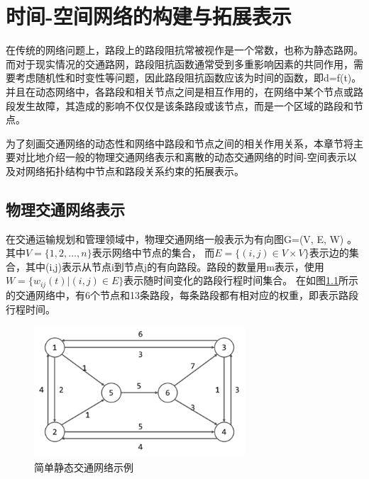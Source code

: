 \chapter{时间-空间网络的构建与拓展表示}\label{ch:时间-空间网络的构建与拓展表示}

在传统的网络问题上，路段上的路段阻抗常被视作是一个常数，也称为静态路网。而对于现实情况的交通路网，路段阻抗函数通常受到多重影响因素的共同作用，需要考虑随机性和时变性等问题，因此路段阻抗函数应该为时间的函数，即d=f(t)。并且在动态网络中，各路段和相关节点之间是相互作用的，在网络中某个节点或路段发生故障，其造成的影响不仅仅是该条路段或该节点，而是一个区域的路段和节点。

为了刻画交通网络的动态性和网络中路段和节点之间的相关作用关系，本章节将主要对比地介绍一般的物理交通网络表示和离散的动态交通网络的时间-空间表示以及对网络拓扑结构中节点和路段关系约束的拓展表示。


\section{物理交通网络表示}\label{sec:物理交通网络表示}

在交通运输规划和管理领域中，物理交通网络一般表示为有向图G=(V, E, W) 。其中$V=\{1, 2, \dots,n\}$表示网络中节点的集合，
而$E=\{(i,j) \in V \times V\}$表示边的集合，其中(i,j)表示从节点i到节点j的有向路段。路段的数量用m表示，使用$W=\{w_{ij} (t)|(i,j)\in E\}$表示随时间变化的路段行程时间集合。
在如图\ref{fig:fig2}所示的交通网络中，有6个节点和13条路段，每条路段都有相对应的权重，即表示路段行程时间。
\begin{figure}[H] %
    \centering %
    \includegraphics[width=0.7\textwidth]{png/图片2 简单静态交通网络示例} %
    \caption{简单静态交通网络示例} %
    \label{fig:fig2} %
\end{figure}

